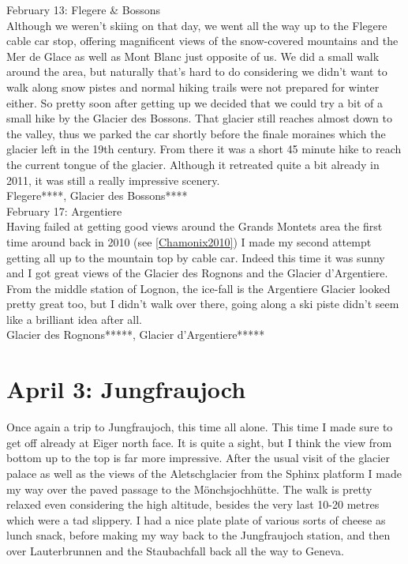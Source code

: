 February 13: Flegere \& Bossons\\
Although we weren't skiing on that day, we went all the way up to the Flegere cable car stop, offering magnificent views of the snow-covered mountains and the Mer de Glace as well as Mont Blanc just opposite of us. We did a small walk around the area, but naturally that's hard to do considering we didn't want to walk along snow pistes and normal hiking trails were not prepared for winter either. So pretty soon after getting up we decided that we could try a bit of a small hike by the Glacier des Bossons. That glacier still reaches almost down to the valley, thus we parked the car shortly before the finale moraines which the glacier left in the 19th century. From there it was a short 45 minute hike to reach the current tongue of the glacier. Although it retreated quite a bit already in 2011, it was still a really impressive scenery.\\

Flegere****, Glacier des Bossons****\\

February 17: Argentiere\\
Having failed at getting good views around the Grands Montets area the first time around back in 2010 (see \ref{Chamonix2010}) I made my second attempt getting all up to the mountain top by cable car. Indeed this time it was sunny and I got great views of the Glacier des Rognons and the Glacier d'Argentiere. From the middle station of Lognon, the ice-fall is the Argentiere Glacier looked pretty great too, but I didn't walk over there, going along a ski piste didn't seem like a brilliant idea after all.\\

Glacier des Rognons*****, Glacier d'Argentiere*****\\

\section{April 3: Jungfraujoch}
\label{Jungfrau2011}

Once again a trip to Jungfraujoch, this time all alone. This time I made sure to get off already at Eiger north face. It is quite a sight, but I think the view from bottom up to the top is far more impressive. After the usual visit of the glacier palace as well as the views of the Aletschglacier from the Sphinx platform I made my way over the paved passage to the M\"onchsjochh\"utte. The walk is pretty relaxed even considering the high altitude, besides the very last 10-20 metres which were a tad slippery. I had a nice plate plate of various sorts of cheese as lunch snack, before making my way back to the Jungfraujoch station, and then over Lauterbrunnen and the Staubachfall back all the way to Geneva.\\

